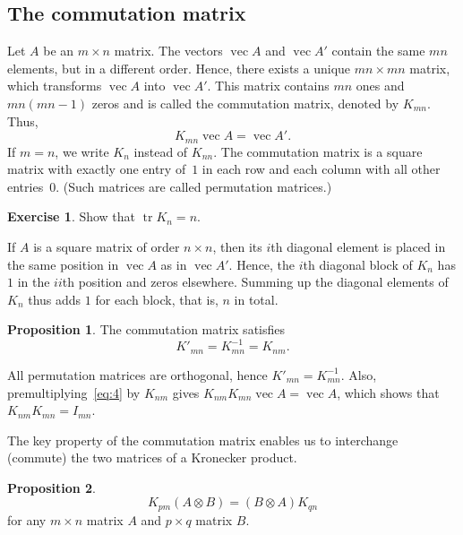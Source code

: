 \documentclass[12pt,a4paper]{article}
\makeatletter
\theoremstyle{definition}
\newtheorem{proposition}{Proposition}
\newtheorem{exercise}{Exercise}
\renewenvironment{proof}[1][\proofname]{\par
  \pushQED{\qed}%
  \normalfont \topsep6\p@\@plus6\p@\relax
  \trivlist
  \item[\hskip\labelsep\bfseries #1\@addpunct{.}]\ignorespaces
}{%
  \popQED\endtrivlist\@endpefalse
}
\newenvironment{solution}{%
  \begin{proof}[Solution]%
}{%
  \end{proof}%
}
\DeclareMathOperator{\tr}{tr}
\DeclareMathOperator{\avec}{vec}
\makeatother
\begin{document}
\subsection{The commutation matrix}\label{sec:2.5}

Let $A$ be an $m \times n$ matrix. The vectors $\avec A$ and $\avec A'$ contain the same $mn$ elements, but in a different order. %
Hence, there exists a unique $mn \times mn$ matrix, which transforms $\avec A$ into $\avec A'$. This matrix contains $mn$ ones and $mn(mn-1)$ zeros and is called the commutation matrix, denoted by $K_{mn}$. %
Thus,
\begin{equation}\label{eq:4}
K_{mn} \avec A = \avec A'.
\end{equation}
If $m = n$, we write $K_n$ instead of $K_{nn}$. The commutation matrix is a square matrix with exactly one entry of~$1$ in each row and each column with all other entries~$0$. (Such matrices are called permutation matrices.) %

\begin{exercise}\label{exer:4}
Show that $\tr K_n = n$.
\end{exercise}

\begin{solution}
If $A$ is a square matrix of order $n \times n$, then its $i$th diagonal element is placed in the same position in $\avec A$ as in $\avec A'$. Hence, the $i$th diagonal block of $K_n$ has $1$ in the $ii$th position and zeros elsewhere. Summing up the diagonal elements of $K_n$ thus adds $1$ for each block, that is, $n$ in total. %
\end{solution}

\begin{proposition}\label{prp:7}
The commutation matrix satisfies
\[
K'_{mn} = K^{-1}_{mn} = K_{nm}.
\]
\end{proposition}

\begin{proof}
All permutation matrices are orthogonal, hence $K'_{mn} = K^{-1}_{mn}$. Also, premultiplying~\eqref{eq:4} by $K_{nm}$ gives $K_{nm} K_{mn} \avec A = \avec A$, which shows that $K_{nm} K_{mn} = I_{mn}$. %
\end{proof}

The key property of the commutation matrix enables us to interchange (commute) the two matrices of a Kronecker product. %

\begin{proposition}\label{prp:8}
\[
K_{pm}(A \otimes B) = (B \otimes A)K_{qn}
\]
for any $m \times n$ matrix $A$ and $p \times q$ matrix $B$.
\end{proposition}
\end{document}
